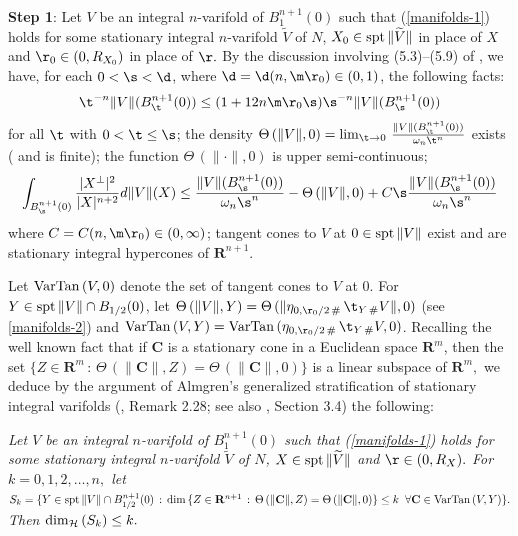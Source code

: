 \documentclass[a4paper,11pt]{amsart}
\begin{document}
\noindent
{\bf Step 1}: Let $V$ be an integral $n$-varifold of $B_{1}^{n+1}(0)$ such that (\ref{manifolds-1}) holds for some 
stationary integral $n$-varifold $\widetilde{V}$ of $N$, $X_{0} \in {\rm spt} \,\|\widetilde{V}\|$ in place of $X$ and $\r_{0} \in (0, R_{X_{0}})$ in place of $\r.$ By the discussion involving (5.3)--(5.9) of \cite{SS}, we have, for each $0 < \s < \d$, where $\d = \d(n, \m\r_{0}) \in (0, 1)$, the following facts:
\begin{equation}\label{monotonicity-N-0}
\t^{-n}\|V\|(B_{\t}^{n+1}(0)) \leq (1 + 12n\m\r_{0}\s)\s^{-n}\|V\|(B_{\s}^{n+1}(0))
\end{equation}
for all $\t$ with $0 < \t \leq \s$; the density 
$\Theta \, (\|V\|, 0) = \lim_{\t \to 0} \, \frac{\|V\|(B_{\t}^{n+1}(0))}{\omega_{n}\t^{n}}$ exists ( and is finite); the function 
$\Theta \, (\|\cdot\|, 0)$ is upper semi-continuous; 
\begin{equation}\label{monotonicity-N}
\int_{B^{n+1}_{\s}(0)} \frac{|X ^{\perp}|^{2}}{|X|^{n+2}} d\|V\|(X) \leq 
\frac{\|V\|(B_{\s}^{n+1}(0))}{\omega_{n}\s^{n}} - \Theta \, (\|V\|, 0) + C\s \frac{\|V\|(B_{\s}^{n+1}(0))}{\omega_{n}\s^{n}}
\end{equation} 
where $C = C(n, \m\r_{0}) \in (0, \infty)$; tangent cones to $V$ at  
$0 \in {\rm spt} \,\|V\|$ exist and are stationary integral hypercones of ${\mathbf R}^{n+1}$. 

Let ${\rm Var Tan} \, (V, 0)$ denote the set of tangent cones to $V$ at $0.$ For $Y \in {\rm spt} \, \|V\| \cap B_{1/2}(0)$, let 
$\Theta \, (\|V\|, Y) = \Theta \, (\|\eta_{0, \r_{0}/2 \, \#} \, \t_{Y \, \#} V\|, 0)$ (see \ref{manifolds-2}) and 
${\rm Var Tan} \, (V, Y) = {\rm Var Tan} \, (\eta_{0, \r_{0}/2 \, \#} \, \t_{Y \, \#} V, 0)$. Recalling the well known fact that if 
${\mathbf C}$ is a stationary cone in a Euclidean space ${\mathbf R}^{m}$, then the set $\{Z \in {\mathbf R}^{m} \, : \, \Theta \, (\|{\mathbf C}\|, Z) = \Theta \, (\|{\mathbf C}\|, 0)\}$ is a linear subspace of ${\mathbf R}^{m},$ we deduce by the argument of Almgren's generalized stratification of stationary integral varifolds (\cite{A}, Remark 2.28; see also \cite{S3}, Section 3.4) the following:

\noindent
\emph{Let $V$ be an integral $n$-varifold of $B_{1}^{n+1}(0)$ such that (\ref{manifolds-1}) holds for some 
stationary integral $n$-varifold $\widetilde{V}$ of $N$, $X \in {\rm spt} \,\|\widetilde{V}\|$ and $\r \in (0, R_{X}).$  For $k=0, 1, 2, \ldots, n,$  let $S_{k} = \{Y \in {\rm spt} \, \|V\| \cap B_{1/2}^{n+1}(0)\, : \, 
{\rm dim} \, \{Z \in {\mathbf R}^{n+1} \, : \, \Theta \, (\|{\mathbf C}\|, Z) = \Theta \, (\|{\mathbf C}\|, 0)\} \leq k 
\;\; \forall {\mathbf C} \in {\rm Var Tan} \, (V,Y)\}.$ Then ${\rm dim}_{\mathcal H} \, (S_{k}) \leq k.$} 
\end{document}
